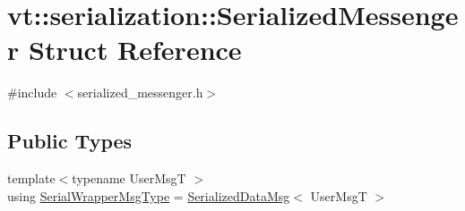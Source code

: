 \hypertarget{structvt_1_1serialization_1_1_serialized_messenger}{}\section{vt\+:\+:serialization\+:\+:Serialized\+Messenger Struct Reference}
\label{structvt_1_1serialization_1_1_serialized_messenger}


{\ttfamily \#include $<$serialized\+\_\+messenger.\+h$>$}

\subsection*{Public Types}
\begin{DoxyCompactItemize}
\item 
{\footnotesize template$<$typename User\+MsgT $>$ }\\using \hyperlink{structvt_1_1serialization_1_1_serialized_messenger_a279027d1664b42cf7f288dc3fc9c3014}{Serial\+Wrapper\+Msg\+Type} = \hyperlink{namespacevt_1_1serialization_a56d2aee859dc963c2b5fad82649dd79a}{Serialized\+Data\+Msg}$<$ User\+MsgT $>$
\end{DoxyCompactItemize}
